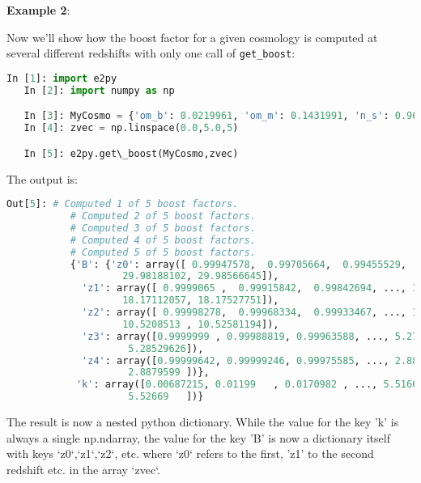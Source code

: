 \documentclass[american,11pt]{article}
\def\code#1{\texttt{#1}}
\begin{document}
\textbf{Example 2}:

Now we'll show how the boost factor for a given cosmology is computed at several different redshifts with only one call of  \code{get\_boost}:
\begin{lstlisting}[language=python]
   In [1]: import e2py
   In [2]: import numpy as np

   In [3]: MyCosmo = {'om_b': 0.0219961, 'om_m': 0.1431991, 'n_s': 0.96, 'h': 0.67, 'w_0': -1.0, 'sigma_8': 0.83}
   In [4]: zvec = np.linspace(0.0,5.0,5)

   In [5]: e2py.get\_boost(MyCosmo,zvec)
\end{lstlisting}
The output is:
\begin{lstlisting}[language=python]
   Out[5]: # Computed 1 of 5 boost factors.
           # Computed 2 of 5 boost factors.
           # Computed 3 of 5 boost factors.
           # Computed 4 of 5 boost factors.
           # Computed 5 of 5 boost factors.
           {'B': {'z0': array([ 0.99947578,  0.99705664,  0.99455529, ..., 29.980257  ,
                    29.98188102, 29.98566645]),
             'z1': array([ 0.9999065 ,  0.99915842,  0.99842694, ..., 18.17388075,
                    18.17112057, 18.17527751]),
             'z2': array([ 0.99998278,  0.99968334,  0.99933467, ..., 10.50938516,
                    10.5208513 , 10.52581194]),
             'z3': array([0.9999999 , 0.99988819, 0.99963588, ..., 5.27193775, 5.2788227 ,
                     5.28529626]),
             'z4': array([0.99999642, 0.99999246, 0.99975585, ..., 2.88413457, 2.88578951,
                     2.8879599 ])},
            'k': array([0.00687215, 0.01199   , 0.0170982 , ..., 5.51663   , 5.52166   ,
                     5.52669   ])}
\end{lstlisting}
The result is now a nested python dictionary. While the value for the key 'k' is always a single np.ndarray, the value for the key 'B' is now a dictionary itself with keys `z0`,`z1`,`z2`, etc. where `z0` refers to the first, 'z1' to the second redshift etc. in the array `zvec`.
\end{document}
